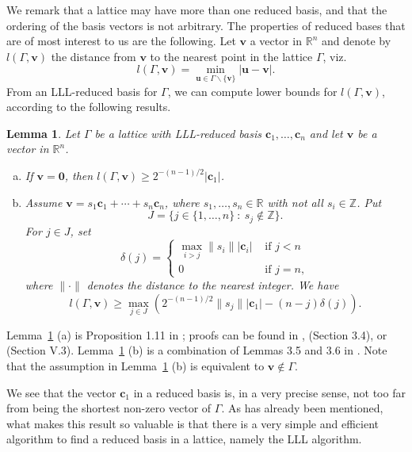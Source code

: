 \documentclass[11pt]{report}
\newtheorem{lemma}[theorem]{Lemma}
\theoremstyle{definition}
\begin{document}
We remark that a lattice may have more than one reduced basis, and that the ordering of the basis vectors is not arbitrary. The properties of reduced bases that are of most interest to us are the following. Let $\mathbf{v}$ a vector in $\mathbb{R}^n$ and denote by $l(\Gamma,\mathbf{v})$ the distance from $\mathbf{v}$ to the nearest point in the lattice $\Gamma$, viz.
\[l(\Gamma,\mathbf{v}) = \min_{\mathbf{u} \in \Gamma \backslash\{\mathbf{v}\}} |\mathbf{u} - \mathbf{v}|.\]
From an LLL-reduced basis for $\Gamma$, we can compute lower bounds for $l(\Gamma,\mathbf{v})$, according to the following results.

\begin{lemma} \label{lem:LLL}
Let $\Gamma$ be a lattice with LLL-reduced basis $\mathbf{c}_1, \dots, \mathbf{c}_n$ and let $\mathbf{v}$ be a vector in $\mathbb{R}^n$.
\begin{enumerate}[(a)]
\item If $\mathbf{v} = \mathbf{0}$, then $l(\Gamma,\mathbf{v}) \geq 2^{-(n-1)/2}|\mathbf{c}_1|$.
\item Assume $\mathbf{v} = s_1\mathbf{c}_1 + \cdots + s_n \mathbf{c}_n$, where $s_1, \dots, s_n \in \mathbb{R}$ with not all $s_i \in \mathbb{Z}$. Put
\[J = \{j \in \{1, \dots, n\} \ : \ s_j \notin \mathbb{Z} \}.\]
For $j \in J$, set
\[\delta(j) =
\begin{cases}
\max_{i > j} \|s_i \| |\mathbf{c}_i| 	& \text{ if } j < n\\
0 							& \text{ if } j = n,
\end{cases}\]
where $\| \cdot \|$ denotes the distance to the nearest integer. We have
\[l(\Gamma,\mathbf{v}) \geq \max_{j \in J}\left(2^{-(n-1)/2}\| s_j\| |\mathbf{c}_1| - (n-j)\delta(j)\right).\]
\end{enumerate}
\end{lemma}
Lemma~\ref{lem:LLL} (a) is Proposition 1.11 in \cite{LLL}; proofs can be found in \cite{LLL}, \cite{Weg0} (Section 3.4), or \cite{Sm} (Section V.3). Lemma~\ref{lem:LLL} (b) is a combination of Lemmas 3.5 and 3.6 in \cite{Weg0}. Note that the assumption in Lemma~\ref{lem:LLL} (b) is equivalent to ${\mathbf{v} \notin \Gamma}$.

We see that the vector $\mathbf{c}_1$ in a reduced basis is, in a very precise sense, not too far from being the shortest non-zero vector of $\Gamma$. As has already been mentioned, what makes this result so valuable is that there is a very simple and efficient algorithm to find a reduced basis in a lattice, namely the LLL algorithm.
\end{document}
